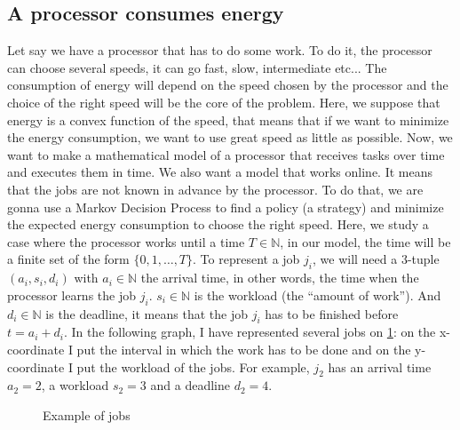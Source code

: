 \documentclass[
10pt, %
a4paper, %
oneside, %
headinclude,footinclude, %
BCOR5mm, %
]{scrartcl}
\newcommand{\N}{\mathbb{N}}
\begin{document}
\subsection{A processor consumes energy}
Let say we have a processor that has to do some work. To do it,
the processor can choose several speeds, it can go fast, slow,
intermediate etc... The consumption of energy will depend on the speed
chosen by the processor and the choice of the right speed will be the
core of the problem.
Here, we suppose that energy is a convex function of
the speed, that means that if we want to minimize the energy
consumption, we want to use great speed as little as possible. Now, we
want to make a mathematical model of a processor that receives tasks
over time and executes them in time. We also want a model that works
online. It means that the jobs are not known in advance by the
processor. To do that, we are gonna use a Markov Decision Process to
find a policy (a strategy) and
minimize the expected energy consumption to choose the right
speed. Here, we study a case where the processor works until a time
$T\in\N$, in our model, the time will be a finite set of the form
$\{0,1,\dots,T\}$. To represent a job $j_i$, we will need a 3-tuple
$(a_i,s_i,d_i)$ with $a_i\in\N$ the arrival time, in other words, the
time when the processor learns the job $j_i$. $s_i\in\N$ is the
workload (the ``amount of work''). And $d_i\in\N$ is the deadline, it
means that the job $j_i$ has to be finished before $t=a_i+d_i$. In the
following graph, I have represented several jobs on \ref{fig:jobs}: on the x-coordinate
I put the interval in which the work has to be done and on the
y-coordinate I put the workload of the jobs. For example, $j_2$ has an
arrival time $a_2=2$, a workload $s_2=3$ and a deadline $d_2=4$. 

\begin{figure}
  \centering
  \caption{Example of jobs}
  \label{fig:jobs}  
\end{figure}
\end{document}
